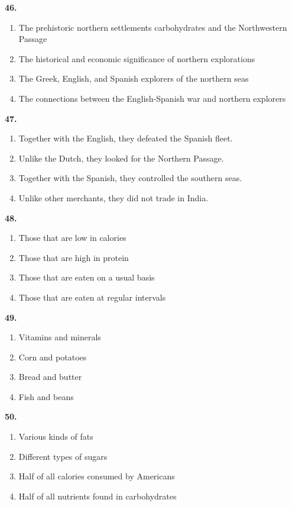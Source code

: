 \documentclass[12pt]{article}
\begin{document}
\par
\vspace{0.25\baselineskip}
\noindent\textbf{46.}
\begin{enumerate}[label=(\Alph*),leftmargin=*,itemsep=0.2em]
\item The prehistoric northern settlements carbohydrates and the Northwestern Passage
\item The historical and economic significance of northern explorations
\item The Greek, English, and Spanish explorers of the northern seas
\item The connections between the English-Spanish war and northern explorers
\end{enumerate}
\par
\vspace{0.25\baselineskip}
\noindent\textbf{47.}
\begin{enumerate}[label=(\Alph*),leftmargin=*,itemsep=0.2em]
\item Together with the English, they defeated the Spanish fleet.
\item Unlike the Dutch, they looked for the Northern Passage.
\item Together with the Spanish, they controlled the southern seas.
\item Unlike other merchants, they did not trade in India.
\end{enumerate}
\par
\vspace{0.25\baselineskip}
\noindent\textbf{48.}
\begin{enumerate}[label=(\Alph*),leftmargin=*,itemsep=0.2em]
\item Those that are low in calories
\item Those that are high in protein
\item Those that are eaten on a usual basis
\item Those that are eaten at regular intervals
\end{enumerate}
\par
\vspace{0.25\baselineskip}
\noindent\textbf{49.}
\begin{enumerate}[label=(\Alph*),leftmargin=*,itemsep=0.2em]
\item Vitamins and minerals
\item Corn and potatoes
\item Bread and butter
\item Fish and beans
\end{enumerate}
\par
\vspace{0.25\baselineskip}
\noindent\textbf{50.}
\begin{enumerate}[label=(\Alph*),leftmargin=*,itemsep=0.2em]
\item Various kinds of fats
\item Different types of sugars
\item Half of all calories consumed by Americans
\item Half of all nutrients found in carbohydrates
\end{enumerate}
\par
\vspace{0.25\baselineskip}
\end{document}
